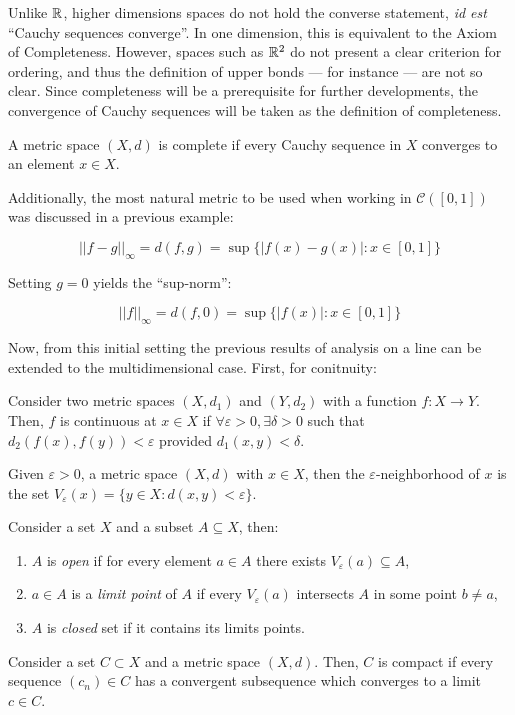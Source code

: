 Unlike $\mathbb{R}$, higher dimensions spaces do not hold the converse statement, \textit{id est} ``Cauchy sequences converge''. In one dimension, this is equivalent to the Axiom of Completeness. However, spaces such as $\mathbb{R}^2$ do not present a clear criterion for ordering, and thus the definition of upper bonds — for instance — are not so clear. Since completeness will be a prerequisite for further developments, the convergence of Cauchy sequences will be taken as the definition of completeness.

\begin{definition}[Completeness]
    A metric space $(X, d)$ is complete if every Cauchy sequence in $X$ converges to an element $x \in X$.
\end{definition}

Additionally, the most natural metric to be used when working in $\mathcal{C}([0,1])$ was discussed in a previous example:

\begin{equation*}
    ||f - g||_\infty  = d(f,g) = \sup \{ |f(x) - g(x)|:x \in [0,1] \}
\end{equation*}

Setting $g = 0$ yields the ``sup-norm'':

\begin{equation*}
    ||f||_\infty = d(f, 0) = \sup \{ |f(x)|:x \in [0,1] \} 
\end{equation*}

Now, from this initial setting the previous results of analysis on a line can be extended to the multidimensional case. First, for conitnuity:

\begin{definition}
    Consider two metric spaces $(X, d_1)$ and $(Y, d_2)$ with a function $f: X \to Y$. Then, $f$ is continuous at $x \in X$ if $\forall \varepsilon > 0, \exists \delta > 0$ such that $d_2(f(x), f(y)) < \varepsilon$ provided $d_1(x, y) < \delta$.
\end{definition}

\begin{definition}
    Given $\varepsilon > 0$, a metric space $(X,d)$ with $x \in X$, then the $\varepsilon$-neighborhood of $x$ is the set $V_\varepsilon (x) = \{ y \in X : d(x, y) < \varepsilon\}$.
\end{definition}

\begin{definition}
    Consider a set $X$ and a subset $A \subseteq X$, then:
    \begin{enumerate}
        \item $A$ is \emph{open} if for every element $a \in A$ there exists $V_\varepsilon(a) \subseteq A$,
        \item $a \in A$ is a \emph{limit point} of $A$ if every $V_\varepsilon(a)$ intersects $A$ in some point $b \neq a$,
        \item $A$ is \emph{closed} set if it contains its limits points.
    \end{enumerate}
\end{definition}


\begin{definition}[Compactness]
    Consider a set $C \subset X$ and a metric space $(X,d)$. Then, $C$ is compact if every sequence $(c_n) \in C$ has a convergent subsequence which converges to a limit $c \in C$.
\end{definition}